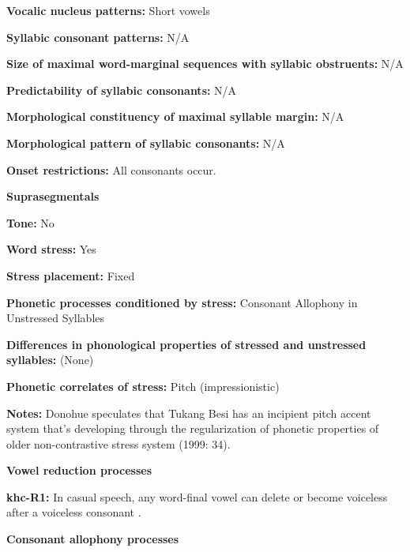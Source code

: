 \textbf{Vocalic nucleus patterns:} Short vowels



\textbf{Syllabic consonant patterns:} N/A



\textbf{Size of maximal word{}-marginal sequences with syllabic obstruents:} N/A



\textbf{Predictability of syllabic consonants:} N/A



\textbf{Morphological constituency of maximal syllable margin:} N/A



\textbf{Morphological pattern of syllabic consonants:} N/A



\textbf{Onset restrictions:} All consonants occur.



\textbf{Suprasegmentals}



\textbf{Tone:} No



\textbf{Word stress:} Yes



\textbf{Stress placement:} Fixed



\textbf{Phonetic processes conditioned by stress:} Consonant Allophony in Unstressed Syllables



\textbf{Differences in phonological properties of stressed and unstressed syllables:} (None)



\textbf{Phonetic correlates of stress:} Pitch (impressionistic)



\textbf{Notes:} Donohue speculates that Tukang Besi has an incipient pitch accent system that’s developing through the regularization of phonetic properties of older non-contrastive stress system (1999: 34).



\textbf{Vowel reduction processes}



\textbf{khc-R1:} In casual speech, any word-final vowel can delete or become voiceless after a voiceless consonant \citep[23]{Donohue1999}.



\textbf{Consonant allophony processes}



